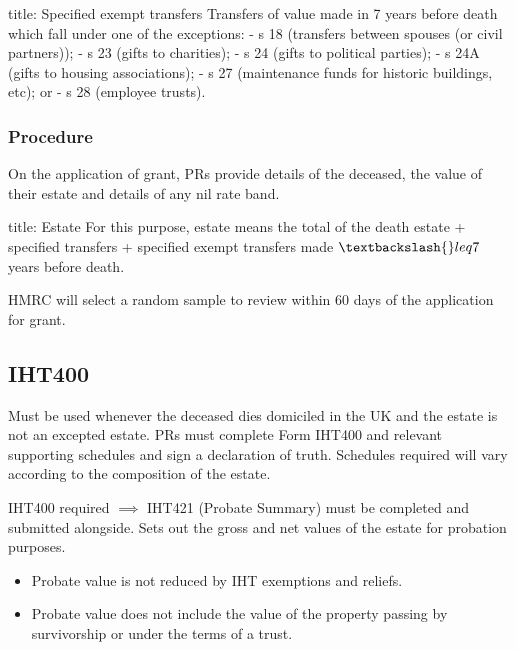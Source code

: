 \documentclass[
]{article}
\newenvironment{Shaded}{}{}
\newcommand{\NormalTok}[1]{#1}
\providecommand{\tightlist}{%
  \setlength{\itemsep}{0pt}\setlength{\parskip}{0pt}}
\begin{document}
\begin{Shaded}
\begin{Highlighting}[]
\NormalTok{title: Specified exempt transfers}
\NormalTok{Transfers of value made in 7 years before death which fall under one of the exceptions:}
\NormalTok{{-} s 18 (transfers between spouses (or civil partners));}
\NormalTok{{-} s 23 (gifts to charities);}
\NormalTok{{-} s 24 (gifts to political parties);}
\NormalTok{{-} s 24A (gifts to housing associations);}
\NormalTok{{-} s 27 (maintenance funds for historic buildings, etc); or}
\NormalTok{{-} s 28 (employee trusts).}
\end{Highlighting}
\end{Shaded}

\hypertarget{procedure}{%
\subsubsection{Procedure}\label{procedure}}

On the application of grant, PRs provide details of the deceased, the
value of their estate and details of any nil rate band.

\begin{Shaded}
\begin{Highlighting}[]
\NormalTok{title: Estate}
\NormalTok{For this purpose, estate means the total of the death estate + specified transfers + specified exempt transfers made $\textbackslash{}leq 7$ years before death.}
\end{Highlighting}
\end{Shaded}

HMRC will select a random sample to review within 60 days of the
application for grant.

\hypertarget{iht400}{%
\subsection{IHT400}\label{iht400}}

Must be used whenever the deceased dies domiciled in the UK and the
estate is not an excepted estate. PRs must complete Form IHT400 and
relevant supporting schedules and sign a declaration of truth. Schedules
required will vary according to the composition of the estate.

IHT400 required \(\implies\) IHT421 (Probate Summary) must be completed
and submitted alongside. Sets out the gross and net values of the estate
for probation purposes.

\begin{itemize}
\tightlist
\item
  Probate value is not reduced by IHT exemptions and reliefs.
\item
  Probate value does not include the value of the property passing by
  survivorship or under the terms of a trust.
\end{itemize}
\end{document}
